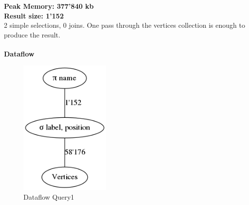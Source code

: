 \documentclass[11pt,singlecolumn]{scrartcl}
\begin{document}
\textbf{Peak Memory: 377'840 kb}\\
\textbf{Result size: 1'152} \\
2 simple selections, 0 joins. One pass through the vertices collection is enough to produce the result.\\\\
\textbf{Dataflow}
\begin{figure}[H]
\includegraphics[width=0.4\textwidth]{graph1}
\caption{Dataflow Query1}
\end{figure}
\clearpage
\end{document}
